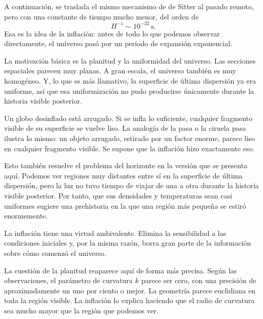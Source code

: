 A continuación, se traslada el mismo mecanismo de de Sitter al pasado remoto, pero con una constante de tiempo mucho menor, del orden de
\begin{equation}
H^{-1}\sim 10^{-32}\,\mathrm{s}.
\end{equation}
Esa es la idea de la inflación: antes de todo lo que podemos observar directamente, el universo pasó por un período de expansión exponencial.

La motivación básica es la planitud y la uniformidad del universo. Las secciones espaciales parecen muy planas. A gran escala, el universo también es muy homogéneo. Y, lo que es más llamativo, la superficie de última dispersión ya era uniforme, así que esa uniformización no pudo producirse únicamente durante la historia visible posterior.

Un globo desinflado está arrugado. Si se infla lo suficiente, cualquier fragmento visible de su superficie se vuelve liso. La analogía de la pasa o la ciruela pasa ilustra lo mismo: un objeto arrugado, estirado por un factor enorme, parece liso en cualquier fragmento visible. Se supone que la inflación hizo exactamente eso.

Esto también resuelve el problema del horizonte en la versión que se presenta aquí. Podemos ver regiones muy distantes entre sí en la superficie de última dispersión, pero la luz no tuvo tiempo de viajar de una a otra durante la historia visible posterior. Por tanto, que sus densidades y temperaturas sean casi uniformes sugiere una prehistoria en la que una región más pequeña se estiró enormemente.

La inflación tiene una virtud ambivalente. Elimina la sensibilidad a las condiciones iniciales y, por la misma razón, borra gran parte de la información sobre cómo comenzó el universo.

La cuestión de la planitud reaparece aquí de forma más precisa. Según las observaciones, el parámetro de curvatura \(k\) parece ser cero, con una precisión de aproximadamente un uno por ciento o mejor. La geometría parece euclidiana en toda la región visible. La inflación lo explica haciendo que el radio de curvatura sea mucho mayor que la región que podemos ver.

\begin{classroomqa}
\end{classroomqa}


